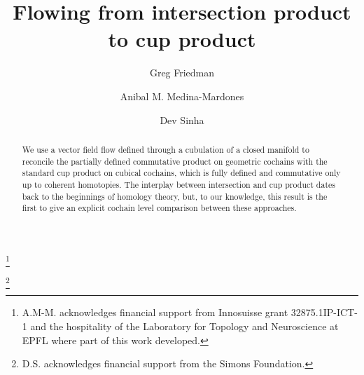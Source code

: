 \documentclass{amsart}
\begin{document}
\title{Flowing from intersection product to cup product}

\author[G. Friedman]{Greg Friedman}
\address{Department of Mathematics, Texas Christian University}

\author[A. Medina-Mardones]{Anibal M. Medina-Mardones}
\address{Max Planck Institute for Mathematics, Bonn, Germany}
\address{Department of Mathematics, University of Notre, Notre Dame, IN, USA}
\thanks{A.M-M. acknowledges financial support from Innosuisse grant \mbox{32875.1IP-ICT-1} and the hospitality of the Laboratory for Topology and Neuroscience at EPFL where part of this work developed.}

\author[D. Sinha]{Dev Sinha}
\address{Mathematics Department, University of Oregon}
\thanks{D.S. acknowledges financial support from the Simons Foundation.}


\begin{abstract}
	We use a vector field flow defined through a cubulation of a closed manifold to reconcile the partially defined commutative product on geometric cochains with the standard cup product on cubical cochains, which is fully defined and commutative only up to coherent homotopies. The interplay between intersection and cup product dates back to the beginnings of homology theory, but, to our knowledge, this result is the first to give an explicit cochain level comparison between these approaches.
\end{abstract}

\maketitle
\tableofcontents
\sloppy
\printbibliography
\end{document}
